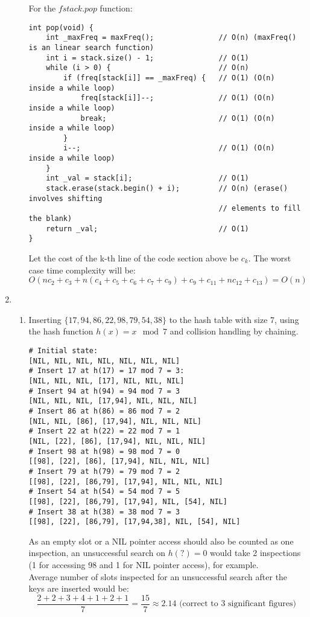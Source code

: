 \documentclass{article}
\begin{document}
\begin{enumerate}
\begin{enumerate}[label=(\alph*)]
        For the $fstack.pop$ function:
        \begin{verbatim}
int pop(void) {
    int _maxFreq = maxFreq();               // O(n) (maxFreq() is an linear search function)
    int i = stack.size() - 1;               // O(1)
    while (i > 0) {                         // O(n)
        if (freq[stack[i]] == _maxFreq) {   // O(1) (O(n) inside a while loop)
            freq[stack[i]]--;               // O(1) (O(n) inside a while loop)
            break;                          // O(1) (O(n) inside a while loop)
        }
        i--;                                // O(1) (O(n) inside a while loop)
    }
    int _val = stack[i];                    // O(1)
    stack.erase(stack.begin() + i);         // O(n) (erase() involves shifting
                                            // elements to fill the blank)
    return _val;                            // O(1)
}
        \end{verbatim}
        Let the cost of the k-th line of the code section above be $c_k$. The worst case time complexity will be:
        \[
        O(nc_2+c_3+n(c_4+c_5+c_6+c_7+c_9)+c_9+c_{11}+nc_{12}+c_{13}) = O(n)
        \]
    \end{enumerate}

\item
    \begin{enumerate}[label=(\alph*)]
        \item Inserting $\{17,94,86,22,98,79,54,38\}$ to the hash table with size 7, using the hash function $h(x) = x \mod 7$ and collision handling by chaining.
        \begin{verbatim}
# Initial state:
[NIL, NIL, NIL, NIL, NIL, NIL, NIL]
# Insert 17 at h(17) = 17 mod 7 = 3:
[NIL, NIL, NIL, [17], NIL, NIL, NIL]
# Insert 94 at h(94) = 94 mod 7 = 3
[NIL, NIL, NIL, [17,94], NIL, NIL, NIL]
# Insert 86 at h(86) = 86 mod 7 = 2
[NIL, NIL, [86], [17,94], NIL, NIL, NIL]
# Insert 22 at h(22) = 22 mod 7 = 1
[NIL, [22], [86], [17,94], NIL, NIL, NIL]
# Insert 98 at h(98) = 98 mod 7 = 0
[[98], [22], [86], [17,94], NIL, NIL, NIL]
# Insert 79 at h(79) = 79 mod 7 = 2
[[98], [22], [86,79], [17,94], NIL, NIL, NIL]
# Insert 54 at h(54) = 54 mod 7 = 5
[[98], [22], [86,79], [17,94], NIL, [54], NIL]
# Insert 38 at h(38) = 38 mod 7 = 3
[[98], [22], [86,79], [17,94,38], NIL, [54], NIL]
        \end{verbatim}
        As an empty slot or a NIL pointer access should also be counted as one inspection, an unsuccessful search on $h(?) = 0$ would take 2 inspections (1 for accessing 98 and 1 for NIL pointer access), for example. \\
        Average number of slots inspected for an unsuccessful search after the keys are inserted would be:
        \[
        \frac{2+2+3+4+1+2+1}{7} = \frac{15}{7} \approx 2.14 \text{ (correct to 3 significant figures)}
        \]


\end{enumerate}
\end{enumerate}
\end{document}
